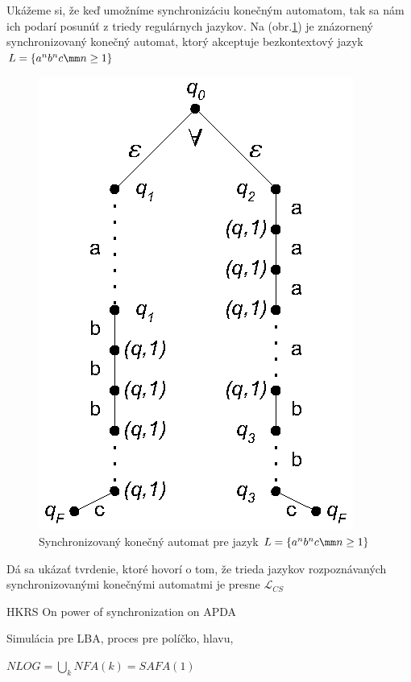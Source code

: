 \begin{priklad}
Ukážeme si, že keď umožníme synchronizáciu konečným automatom, tak
sa nám ich podarí posunúť z triedy regulárnych jazykov. Na
(obr.\ref{anbnc}) je znázornený synchronizovaný konečný automat,
ktorý akceptuje bezkontextový jazyk $L=\{a^nb^nc\mm n\geq1\}$
\end{priklad}

\begin{figure}[!ht]
\centering
\includegraphics{./OBRAZKY/ANBNC}
\caption{Synchronizovaný konečný automat pre jazyk $L=\{a^nb^nc\mm
n\geq1\}$} \label{anbnc}
\end{figure}

\begin{poznamka}
Dá sa ukázať tvrdenie, ktoré hovorí o tom, že trieda jazykov
rozpoznávaných synchronizovanými konečnými automatmi je presne
$\mathcal{L}_{CS}$
\end{poznamka}

HKRS On power of synchronization on APDA

Simulácia pre LBA, proces pre políčko, hlavu, 


\begin{veta}
$NLOG = \bigcup_k NFA(k) = SAFA(1)$
\end{veta}

